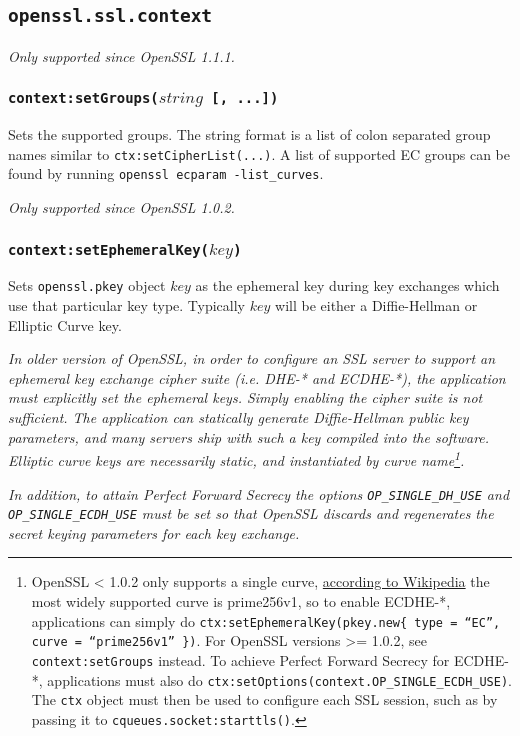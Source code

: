 \documentclass[11pt, oneside]{memoir}
\newcommand*{\fn}[1]{\texttt{#1}\xspace}
\newcommand*{\module}[1]{\texttt{#1}\xspace}
\newcounter{toccols}
\newenvironment{Module}[1]{
	\subsection{\texttt{#1}}
	\addtocontents{toc}{
		\protect\begin{multicols}{\value{toccols}}
	}
}{
	\addtocontents{toc}{\protect\end{multicols}}
}
\begin{document}
\begin{Module}{openssl.ssl.context}
\emph{Only supported since OpenSSL 1.1.1.}

\subsubsection[\fn{context:setGroups}]{\fn{context:setGroups($string$ [, ...])}}

Sets the supported groups. The string format is a list of colon separated group names similar to \texttt{ctx:setCipherList(...)}.
A list of supported EC groups can be found by running \texttt{openssl ecparam -list\_curves}.

\emph{Only supported since OpenSSL 1.0.2.}

\subsubsection[\fn{context:setEphemeralKey}]{\fn{context:setEphemeralKey($key$)}}

Sets \module{openssl.pkey} object $key$ as the ephemeral key during key exchanges which use that particular key type. Typically $key$ will be either a Diffie-Hellman or Elliptic Curve key.

\emph{In older version of OpenSSL, in order to configure an SSL server to support an ephemeral key exchange cipher suite (i.e. DHE-* and ECDHE-*), the application must explicitly set the ephemeral keys. Simply enabling the cipher suite is not sufficient. The application can statically generate Diffie-Hellman public key parameters, and many servers ship with such a key compiled into the software. Elliptic curve keys are necessarily static, and instantiated by curve name\footnote{OpenSSL < 1.0.2 only supports a single curve, \href{http://en.wikipedia.org/w/index.php?title=Comparison\_of\_TLS\_implementations&oldid=629779090\#Supported\_elliptic\_curves}{according to Wikipedia} the most widely supported curve is prime256v1, so to enable ECDHE-*, applications can simply do \texttt{ctx:setEphemeralKey(pkey.new\{ type = ``EC'', curve = ``prime256v1'' \})}. For OpenSSL versions >= 1.0.2, see \fn{context:setGroups} instead. To achieve Perfect Forward Secrecy for ECDHE-*, applications must also do \texttt{ctx:setOptions(context.OP\_SINGLE\_ECDH\_USE)}. The \texttt{ctx} object must then be used to configure each SSL session, such as by passing it to \fn{cqueues.socket:starttls()}.}.}

\emph{In addition, to attain Perfect Forward Secrecy the options \texttt{OP\_SINGLE\_DH\_USE} and \texttt{OP\_SINGLE\_ECDH\_USE} must be set so that OpenSSL discards and regenerates the secret keying parameters for each key exchange.}


\end{Module}
\end{document}
